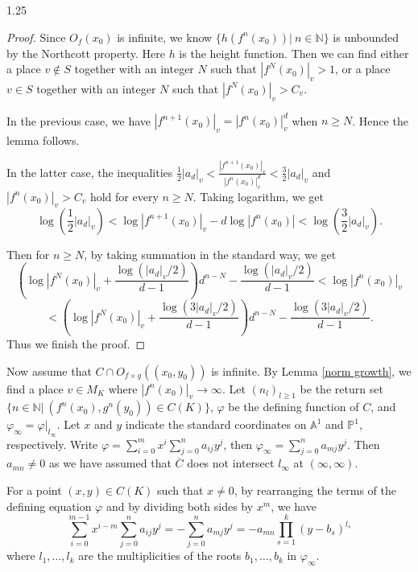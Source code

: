 \documentclass[12pt]{amsart}
\begin{document}
\begin{spacing}{1.25}
\begin{proof}
    Since $O_f(x_0)$ is infinite, we know $\{h(f^n(x_0)) |\ n\in \mathbb{N}\}$ is unbounded by the Northcott property. Here $h$ is the height function. Then we can find either a place $v\notin S$ together with an integer $N$ such that $|f^N(x_0)|_v > 1$, or a place $v\in S$ together with an integer $N$ such that $|f^N(x_0)|_v > C_v$.
    
    In the previous case, we have $|f^{n+1}(x_0)|_v = |f^n(x_0)|_v^d$ when $n\geq N$. Hence the lemma follows.
    
    In the latter case, the inequalities $\frac{1}{2} |a_d|_v < \frac{|f^{n+1}(x_0)|_v}{|f^n(x_0)|_v^d} < \frac{3}{2} |a_d|_v$ and $|f^n(x_0)|_v>C_v$ hold for every $n\geq N$. Taking logarithm, we get
    $$ \log(\frac{1}{2}|a_d|_v) < \log |f^{n+1}(x_0)|_v - d\log|f^n(x_0)| < \log(\frac{3}{2}|a_d|_v).$$
    
    Then for $n\geq N$, by taking summation in the standard way, we get $$(\log|f^N(x_0)|_v+\frac{\log(|a_d|_v/2)}{d-1})d^{n-N} - \frac{\log(|a_d|_v/2)}{d-1} < \log |f^n(x_0)|_v$$
    $$< (\log|f^N(x_0)|_v+\frac{\log(3|a_d|_v/2)}{d-1})d^{n-N} - \frac{\log(3|a_d|_v/2)}{d-1}.$$
    Thus we finish the proof.
\end{proof}

    Now assume that $C \cap O_{f \times g}((x_0,y_0))$ is infinite. By Lemma \ref{norm growth}, we find a place $v\in M_K$ where $|f^n(x_0)|_v \to \infty$. Let $(n_l)_{l\geq1}$ be the return set $\{n\in \mathbb{N}|\ (f^{n}(x_0), g^{n}(y_0)) \in C(K)\}$, $\varphi$ be the defining function of $C$, and $\varphi_\infty = \varphi|_{l_\infty}$. Let $x$ and $y$ indicate the standard coordinates on $\mathbb{A}^1$ and $\mathbb{P}^1$, respectively. Write $\varphi = \sum_{i=0}^{m}{x^i \sum_{j=0}^{n}{a_{ij}y^j}}$, then $\varphi_\infty = \sum_{j=0}^{n}{a_{mj}y^j}$. Then $a_{mn} \neq 0$ as we have assumed that $\overline{C}$ does not intersect $l_\infty$ at $(\infty,\infty)$.

    For a point $(x,y) \in C(K)$ such that $x\neq0$, by rearranging the terms of the defining equation $\varphi$ and by dividing both sides by $x^m$, we have
    \begin{equation}\label{eq1}
        \sum_{i=0}^{m-1}{x^{i-m} \sum_{j=0}^{n}{a_{ij}y^j}} = -\sum_{j=0}^{n}{a_{mj}y^j} = -a_{mn}\prod_{s=1}^{k}(y-b_s)^{l_s}
    \end{equation}
    where $l_1,\dots,l_k$ are the multiplicities of the roots $b_1,\dots,b_k$ in $\varphi_{\infty}$.


\end{spacing}
\end{document}
